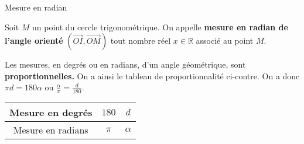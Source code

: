 \documentclass[11pt]{article}
\begin{document}
\begin{defi}{Mesure en radian}
  \begin{minipage}{.6\textwidth}
  Soit $M$ un point du cercle trigonométrique. On appelle \textbf{mesure en
  radian de l'angle orienté} $(\overrightarrow{OI}, \overrightarrow{OM})$ tout
  nombre réel $x\in\mathbb{R}$ associé au point $M$.
    \end{minipage}
  \begin{minipage}{.4\textwidth}
    \begin{center}
    \end{center}
    \end{minipage}

\end{defi}

\begin{prop}
  \begin{minipage}{.6\textwidth}
  Les mesures, en degrés ou en radians, d'un angle géométrique, sont
  \textbf{proportionnelles.} On a ainsi le tableau de proportionnalité
  ci-contre. On a donc $\pi d=180\alpha$ ou
  $\frac{\alpha}{\pi}=\frac{d}{180}$.
\end{minipage}
  \begin{minipage}{.4\textwidth}
  \begin{center}
\def\arraystretch{1.5}
\begin{tabular}[]{|c|c|c|}
  \hline
  Mesure en degrés & $180$ & $d$ \\
  \hline
  Mesure en radians & $\pi$ & $\alpha$ \\
  \hline
\end{tabular}
  \end{center}
\end{minipage}
\end{prop}
\end{document}
